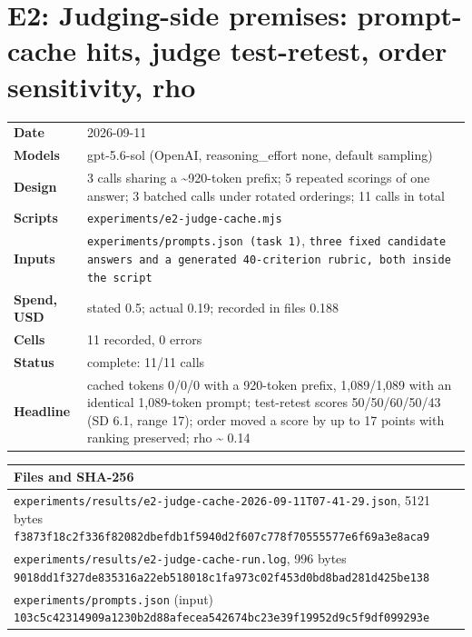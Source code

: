 \documentclass[11pt]{article}
\begin{document}
\section*{E2: Judging-side premises: prompt-cache hits, judge test-retest, order sensitivity, rho}
\begin{longtable}{@{}p{}p{}@{}}\toprule
\textbf{Date} & 2026-09-11 \\
\textbf{Models} & gpt-5.6-sol (OpenAI, reasoning\_effort none, default sampling) \\
\textbf{Design} & 3 calls sharing a \textasciitilde{}920-token prefix; 5 repeated scorings of one answer; 3 batched calls under rotated orderings; 11 calls in total \\
\textbf{Scripts} & \texttt{experiments/e2-judge-cache.mjs} \\
\textbf{Inputs} & \texttt{experiments/prompts.json (task 1)}, \texttt{three fixed candidate answers and a generated 40-criterion rubric, both inside the script} \\
\textbf{Spend, USD} & stated 0.5; actual 0.19; recorded in files 0.188 \\
\textbf{Cells} & 11 recorded, 0 errors \\
\textbf{Status} & complete: 11/11 calls \\
\textbf{Headline} & cached tokens 0/0/0 with a 920-token prefix, 1,089/1,089 with an identical 1,089-token prompt; test-retest scores 50/50/60/50/43 (SD 6.1, range 17); order moved a score by up to 17 points with ranking preserved; rho \textasciitilde{} 0.14 \\
\bottomrule\end{longtable}
\begin{longtable}{@{}p{}@{}}\toprule
\textbf{Files and SHA-256} \\\midrule
\texttt{experiments/results/e2-judge-cache-2026-09-11T07-41-29.json}, 5121 bytes \newline \texttt{\scriptsize f3873f18c2f336f82082dbefdb1f5940d2f607c778f70555577e6f69a3e8aca9} \\[2pt]
\texttt{experiments/results/e2-judge-cache-run.log}, 996 bytes \newline \texttt{\scriptsize 9018dd1f327de835316a22eb518018c1fa973c02f453d0bd8bad281d425be138} \\[2pt]
\texttt{experiments/prompts.json} (input) \newline \texttt{\scriptsize 103c5c42314909a1230b2d88afecea542674bc23e39f19952d9c5f9df099293e} \\[2pt]
\bottomrule\end{longtable}
\end{document}
